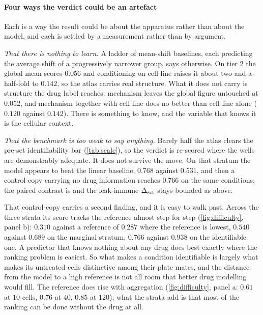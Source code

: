   \paragraph{Four ways the verdict could be an artefact} Each is a way the result
  could be about the apparatus rather than about the model, and each is settled by
  a measurement rather than by argument.
  
  \emph{That there is nothing to learn.} A ladder of mean-shift baselines, each
  predicting the average shift of a progressively narrower group, says
  otherwise. On tier 2 the global
  mean scores $0.056$ and conditioning on cell line raises it about
  two-and-a-half-fold to $0.142$, so the atlas carries real structure. What it does
  not carry is structure the drug label reaches: mechanism leaves the global figure
  untouched at $0.052$, and mechanism together with cell line does no better than
  cell line alone ($0.120$ against $0.142$). There is something to know, and the
  variable that knows it is the cellular context.
  
  \emph{That the benchmark is too weak to say anything.} Barely half the atlas
  clears the pre-set identifiability bar (\cref{tab:scale}), so the verdict is
  re-scored where the wells are demonstrably adequate. It does not survive the
  move. On that stratum the model appears to beat the linear baseline, $0.768$
  against $0.531$, and then a control-copy carrying no drug information reaches
  $0.766$ on the same conditions; the paired contrast is
   and the leak-immune $\Delta_{\textrm{scr}}$ stays bounded as above.
  
  That control-copy carries a second finding, and it is easy to walk past. Across
  the three strata its score tracks the reference almost step for step
  (\cref{fig:difficulty}, panel b): $0.310$ against a reference of $0.287$ where
  the reference is lowest, $0.540$ against $0.689$ on the marginal stratum, $0.766$
  against $0.938$ on the identifiable one. A predictor that knows nothing about any
  drug does best exactly where the ranking problem is easiest. So what makes a
  condition identifiable is largely what makes its untreated cells distinctive
  among their plate-mates, and the distance from the model to a high reference is
  not all room that better drug modelling would fill. The reference does rise with
  aggregation (\cref{fig:difficulty}, panel a: $0.61$ at $10$ cells, $0.76$ at
  $40$, $0.85$ at $120$); what the strata add is that most of the ranking can be
  done without the drug at all.
  
